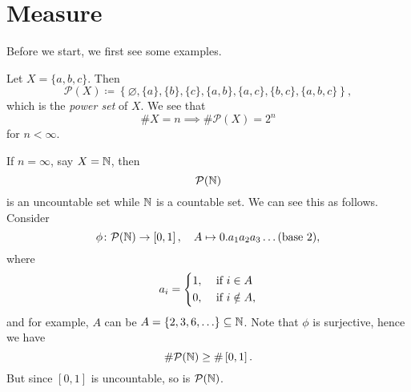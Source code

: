 \chapter{Measure}\label{ch:Measure}
Before we start, we first see some examples.
\begin{eg}
	Let \(X = \{a, b, c\}\). Then
	\[
		\mathcal{P}(X)\coloneqq \left\{\varnothing , \{a\}, \{b\}, \{c\}, \{a, b\}, \{a, c\}, \{b, c\}, \{a, b, c\}\right\},
	\]
	which is the \emph{power set} of \(X\). We see that
	\[
		\# X = n \implies \# \mathcal{P}(X) = 2^n
	\]
	for \(n< \infty\).
\end{eg}
\begin{eg}
	If \(n = \infty\), say \(X = \mathbb{\MakeUppercase{N}} \), then
	\[
		\mathcal{P} (\mathbb{\MakeUppercase{N}} )
	\]
	is an uncountable set while \(\mathbb{\MakeUppercase{N}}\) is a countable set. We can see this as follows. Consider
	\[
		\phi\colon \mathcal{P}(\mathbb{\MakeUppercase{N}}) \to \left[0, 1\right],\quad A\mapsto 0.a_1 a_2 a_3 \ldots (\text{base }2),
	\]
	where
	\[
		a_i = \begin{dcases}
			1, & \text{ if } i\in A     \\
			0, & \text{ if } i\notin A,
		\end{dcases}
	\]
	and for example, \(A\) can be
	\(A = \{2, 3, 6, \ldots  \}\subseteq \mathbb{\MakeUppercase{N}}\). Note that \(\phi\) is surjective, hence we have
	\[
		\# \mathcal{P}(\mathbb{\MakeUppercase{N}} ) \geq \#\left[0, 1\right].
	\]
	But since \(\left[0, 1\right]\) is uncountable, so is \(\mathcal{P} (\mathbb{\MakeUppercase{N}} )\).
\end{eg}

